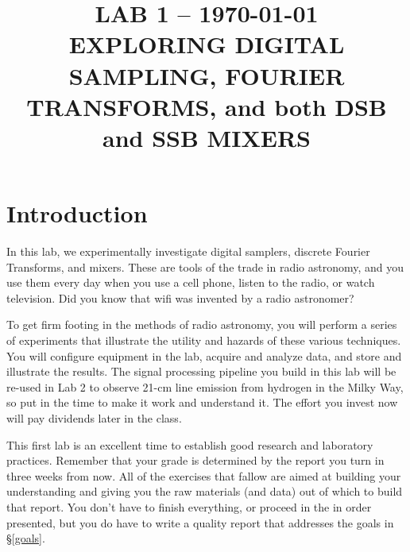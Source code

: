 \documentclass[12pt,preprint]{aastex}
\begin{document}
\def\simlt{\lower.5ex\hbox{$\; \buildrel < \over \sim \;$}}
\def\simgt{\lower.5ex\hbox{$\; \buildrel > \over \sim \;$}}

\title {LAB 1 -- \today \\ EXPLORING DIGITAL SAMPLING, FOURIER TRANSFORMS, and
  both DSB and SSB MIXERS}

\tableofcontents


\section{Introduction}

\noindent
In this lab, we experimentally investigate digital
samplers, discrete Fourier Transforms, and mixers. These are 
tools of the trade in radio astronomy, and
you use them every day when you use a cell phone, listen to the radio,
or watch television. Did you know that wifi was invented by a radio
astronomer?

To get firm footing in the methods of radio astronomy, you will perform a series of
experiments that illustrate the utility and hazards of these various techniques. 
You will configure equipment in the lab, acquire and analyze data, and store and illustrate the results.
The signal processing pipeline you build in this lab will be re-used in Lab 2 to
observe 21-cm line emission from hydrogen in the Milky Way, so 
put in the time to make it work and understand it. The effort you
invest now will pay dividends later in the class.

This first lab is an excellent time to establish good research and laboratory practices.
Remember that your grade is determined by the report you turn in
three weeks from now. All of the exercises that fallow are aimed at building your
understanding and giving you the raw materials (and data) out of which to build that report.
You don't have to finish everything, or proceed in the in order presented, but you do have
to write a quality report that addresses the goals in \S\ref{goals}.
\end{document}
